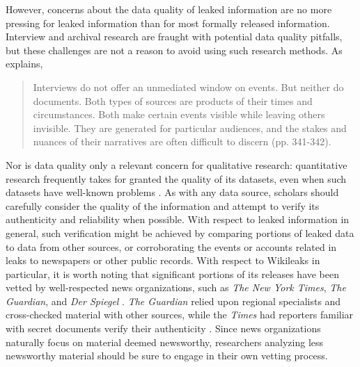 \documentclass[12pt]{article}
\begin{document}
However, concerns about the data quality of leaked information are no more pressing for 
leaked information than for most formally released information. Interview and archival research are 
fraught with potential data quality pitfalls, but these challenges are not a reason to avoid 
using such research methods. As \citet{hecht2012being} explains,
\begin{quote}
Interviews do not offer an unmediated window on events. But neither do documents. Both 
types of sources are products of their times and circumstances. Both make certain events visible while 
leaving others invisible. They are generated for particular audiences, and the stakes and nuances 
of their narratives are often difficult to discern (pp. 341-342).
\end{quote}
Nor is data quality only a relevant concern for qualitative research: 
quantitative research frequently takes for granted the quality of its datasets, even 
when such datasets have well-known problems \citep{herrera2007improving}.
As with any data source, scholars should 
carefully consider the quality of the information and attempt to verify its authenticity and 
reliability when possible. With respect to leaked information in general, such verification might be 
achieved by 
comparing portions of leaked data to data from other sources, or corroborating the events or accounts related 
in leaks to newspapers or other public records.
With respect to Wikileaks in particular, it is worth noting that significant portions of its releases  
have been vetted by well-respected news organizations, such as \emph{The New York Times}, 
\emph{The Guardian}, and \emph{Der Spiegel} \citep{debevec2010professor:}. 
\emph{The Guardian} relied upon regional specialists and cross-checked material with other sources, while
the \emph{Times} had reporters familiar with secret documents verify their 
authenticity \citep{kirchner2010gaining,morisy2010bill}. Since news organizations naturally focus on 
material deemed newsworthy, researchers analyzing less newsworthy material should be sure to engage in 
their own vetting process.
\end{document}

